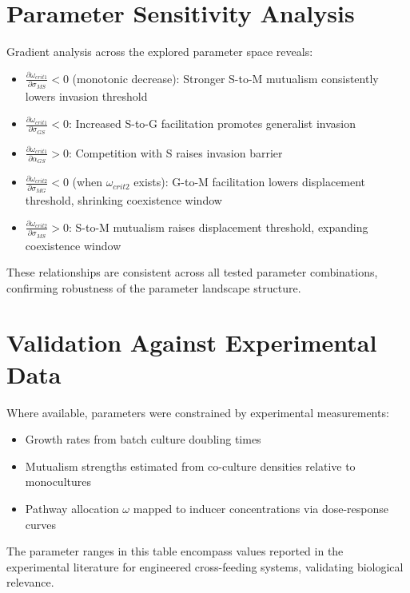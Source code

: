 \documentclass[11pt]{article}
\begin{document}
\section*{Parameter Sensitivity Analysis}

Gradient analysis across the explored parameter space reveals:

\begin{itemize}
    \item $\frac{\partial \omega_{crit1}}{\partial \sigma_{MS}} < 0$ (monotonic decrease): Stronger S-to-M mutualism consistently lowers invasion threshold
    \item $\frac{\partial \omega_{crit1}}{\partial \sigma_{GS}} < 0$: Increased S-to-G facilitation promotes generalist invasion
    \item $\frac{\partial \omega_{crit1}}{\partial \alpha_{GS}} > 0$: Competition with S raises invasion barrier
    \item $\frac{\partial \omega_{crit2}}{\partial \sigma_{MG}} < 0$ (when $\omega_{crit2}$ exists): G-to-M facilitation lowers displacement threshold, shrinking coexistence window
    \item $\frac{\partial \omega_{crit2}}{\partial \sigma_{MS}} > 0$: S-to-M mutualism raises displacement threshold, expanding coexistence window
\end{itemize}

These relationships are consistent across all tested parameter combinations, confirming robustness of the parameter landscape structure.

\section*{Validation Against Experimental Data}

Where available, parameters were constrained by experimental measurements:

\begin{itemize}
    \item Growth rates from batch culture doubling times \cite{harcombe2014metabolic,mee2014syntrophic}
    \item Mutualism strengths estimated from co-culture densities relative to monocultures \cite{shou2007synthetic,hoek2016resource}
    \item Pathway allocation $\omega$ mapped to inducer concentrations via dose-response curves \cite{guantes2006multistable}
\end{itemize}

The parameter ranges in this table encompass values reported in the experimental literature for engineered cross-feeding systems, validating biological relevance.
\end{document}
